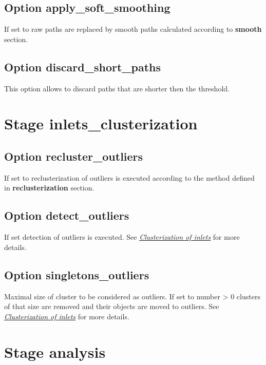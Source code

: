 \documentclass[a4paper,10pt,english]{sphinxmanual}
\begin{document}
\subsection{Option \textbf{apply\_soft\_smoothing}}
\label{valve/valve_config:option-apply-soft-smoothing}
If set to  raw paths are replaced by smooth paths calculated according to \textbf{smooth} section.


\subsection{Option \textbf{discard\_short\_paths}}
\label{valve/valve_config:option-discard-short-paths}
This option allows to discard paths that are shorter then the threshold.


\section{Stage \textbf{inlets\_clusterization}}
\label{valve/valve_config:stage-inlets-clusterization}

\subsection{Option \textbf{recluster\_outliers}}
\label{valve/valve_config:option-recluster-outliers}
If set to  reclusterization of outliers is executed according to the method defined in \textbf{reclusterization} section.


\subsection{Option \textbf{detect\_outliers}}
\label{valve/valve_config:option-detect-outliers}
If set detection of outliers is executed. See {\hyperref[valve/valve_manual:clusterization-of-inlets]{\emph{Clusterization of inlets}}} for more details.


\subsection{Option \textbf{singletons\_outliers}}
\label{valve/valve_config:option-singletons-outliers}
Maximal size of cluster to be considered as outliers. If set to number \textgreater{} 0 clusters of that size are removed and their objects are moved to outliers. See {\hyperref[valve/valve_manual:clusterization-of-inlets]{\emph{Clusterization of inlets}}} for more details.


\section{Stage \textbf{analysis}}
\label{valve/valve_config:stage-analysis}
\end{document}

